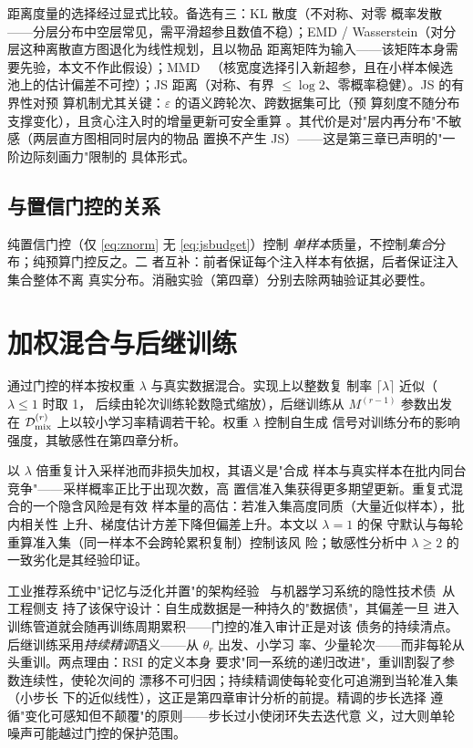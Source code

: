 距离度量的选择经过显式比较。备选有三：KL 散度（不对称、对零
概率发散——分层分布中空层常见，需平滑超参且数值不稳）；EMD
/ Wasserstein（对分层这种离散直方图退化为线性规划，且以物品
距离矩阵为输入——该矩阵本身需要先验，本文不作此假设）；MMD
~\cite{gretton2012mmd}（核宽度选择引入新超参，且在小样本候选
池上的估计偏差不可控）；JS
距离（对称、有界 $\leq \log 2$、零概率稳健）。JS 的有界性对预
算机制尤其关键：$\varepsilon$ 的语义跨轮次、跨数据集可比（预
算刻度不随分布支撑变化），且贪心注入时的增量更新可安全重算
。其代价是对"层内再分布"不敏感（两层直方图相同时层内的物品
置换不产生 JS）——这是第三章已声明的"一阶边际刻画力"限制的
具体形式。

\subsection{与置信门控的关系}
纯置信门控（仅 \eqref{eq:znorm} 无 \eqref{eq:jsbudget}）控制
\emph{单样本}质量，不控制\emph{集合}分布；纯预算门控反之。二
者互补：前者保证每个注入样本有依据，后者保证注入集合整体不离
真实分布。消融实验（第四章）分别去除两轴验证其必要性。

\section{加权混合与后继训练}\label{sec:mix}
通过门控的样本按权重 $\lambda$ 与真实数据混合。实现上以整数复
制率 $\lceil \lambda \rceil$ 近似（$\lambda \leq 1$ 时取 1，
后续由轮次训练轮数隐式缩放），后继训练从 $M^{(r-1)}$ 参数出发
在 $\mathcal{D}_{\mathrm{mix}}^{(r)}$ 上以较小学习率精调若干轮。权重 $\lambda$ 控制自生成
信号对训练分布的影响强度，其敏感性在第四章分析。

以 $\lambda$ 倍重复计入采样池而非损失加权，其语义是"合成
样本与真实样本在批内同台竞争"——采样概率正比于出现次数，高
置信准入集获得更多期望更新。重复式混合的一个隐含风险是有效
样本量的高估：若准入集高度同质（大量近似样本），批内相关性
上升、梯度估计方差下降但偏差上升。本文以 $\lambda = 1$ 的保
守默认与每轮重算准入集（同一样本不会跨轮累积复制）控制该风
险；敏感性分析中 $\lambda \geq 2$ 的一致劣化是其经验印证。

工业推荐系统中"记忆与泛化并置"的架构经验~\cite{cheng2017wide}
与机器学习系统的隐性技术债~\cite{sculley2015hidden}从工程侧支
持了该保守设计：自生成数据是一种持久的"数据债"，其偏差一旦
进入训练管道就会随再训练周期累积——门控的准入审计正是对该
债务的持续清点。后继训练采用\emph{持续精调}语义——从 $\theta_r$ 出发、小学习
率、少量轮次——而非每轮从头重训。两点理由：RSI 的定义本身
要求"同一系统的递归改进"，重训割裂了参数连续性，使轮次间的
漂移不可归因；持续精调使每轮变化可追溯到当轮准入集（小步长
下的近似线性），这正是第四章审计分析的前提。精调的步长选择
遵循"变化可感知但不颠覆"的原则——步长过小使闭环失去迭代意
义，过大则单轮噪声可能越过门控的保护范围。

